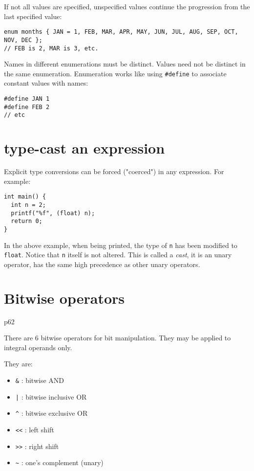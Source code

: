 \documentclass[12pt]{article}
\begin{document}
If not all values are specified, unspecified values continue the progression from the last specified value:
\begin{verbatim}
enum months { JAN = 1, FEB, MAR, APR, MAY, JUN, JUL, AUG, SEP, OCT, NOV, DEC };
// FEB is 2, MAR is 3, etc.
\end{verbatim}

Names in different enumerations must be distinct. Values need not be distinct in the same enumeration. Enumeration works like using \texttt{\#define} to associate constant values with names:
\begin{verbatim}
#define JAN 1
#define FEB 2
// etc
\end{verbatim}
\section{type-cast an expression}
\label{sec:orgd5720dd}
Explicit type conversions can be forced ("coerced") in any expression. For example:
\begin{verbatim}
int main() {
  int n = 2;
  printf("%f", (float) n);
  return 0;
}
\end{verbatim}
In the above example, when being printed, the type of \texttt{n} has been modified to \texttt{float}. Notice that \texttt{n} itself is not altered. This is called a \emph{cast}, it is an unary operator, has the same high precedence as other unary operators.
\section{Bitwise operators}
\label{sec:orge4e4dc9}
p62

There are 6 bitwise operators for bit manipulation. They may be applied to integral operands only.

They are:
\begin{itemize}
\item \texttt{\&}  : bitwise AND
\item \texttt{|}  : bitwise inclusive OR
\item \texttt{\textasciicircum{}}  : bitwise exclusive OR
\item \texttt{<<} : left shift
\item \texttt{>>} : right shift
\item \texttt{\textasciitilde{}}  : one's complement (unary)
\end{itemize}
\end{document}

